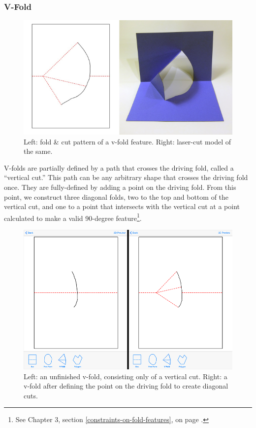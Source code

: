 \subsubsection{V-Fold}\label{v-fold}

\begin{figure}[htbp]
\centering
\includegraphics{figures/33_UI_Interface_Data_Structures/v.pdf}
\caption{Left: fold \& cut pattern of a v-fold feature. Right: laser-cut
model of the same.}
\end{figure}

V-folds are partially defined by a path that crosses the driving fold,
called a ``vertical cut.'' This path can be any arbitrary shape that
crosses the driving fold once. They are fully-defined by adding a point
on the driving fold. From this point, we construct three diagonal folds,
two to the top and bottom of the vertical cut, and one to a point that
intersects with the vertical cut at a point calculated to make a valid
90-degree feature\footnote{See Chapter 3, section
  \ref{constraints-on-fold-features},
   on page
  \pageref{geometric-constraints}.}.

\begin{figure}[htbp]
\centering
\includegraphics{figures/33_UI_Interface_Data_Structures/vfold_before_after.png}
\caption{Left: an unfinished v-fold, consisting only of a vertical cut.
Right: a v-fold after defining the point on the driving fold to create
diagonal cuts.}
\end{figure}

